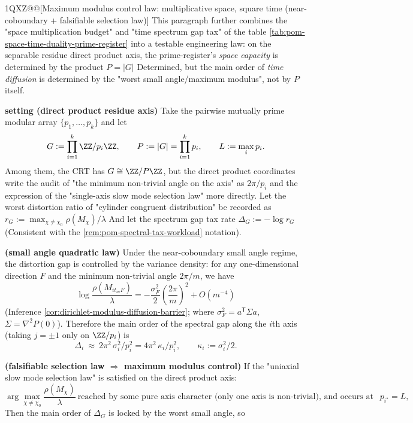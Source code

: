 \begin@@ZXQPH1QXZ@@[Maximum modulus control law: multiplicative space, square time (near-coboundary + falsifiable selection law)]\label{rem:pom-max-modulus-control-law}
This paragraph further combines the "space multiplication budget" and "time spectrum gap tax" of the table \ref{tab:pom-space-time-duality-prime-register} into a testable engineering law: on the separable residue direct product axis, the prime-register's \emph{space capacity} is determined by the product \(P=|G|\) Determined, but the main order of \emph{time diffusion} is determined by the "worst small angle/maximum modulus", not by \(P\) itself.
\par
\medskip\noindent\textbf{setting (direct product residue axis)}
Take the pairwise mutually prime modular array \(\{p_1,\dots,p_k\}\) and let
\[
G:=\prod_{i=1}^k\ZZ/p_i\ZZ,
\qquad
P:=|G|=\prod_{i=1}^k p_i,
\qquad
L:=\max_i p_i.
\]
Among them, the CRT has \(G\cong \ZZ/P\ZZ\), but the direct product coordinates write the audit of "the minimum non-trivial angle on the axis" as \(2\pi/p_i\) and the expression of the "single-axis slow mode selection law" more directly.
Let the worst distortion ratio of "cylinder congruent distribution" be recorded as
\(
r_G:=\max_{\chi\neq\chi_0}\rho(M_\chi)/\lambda
\)
And let the spectrum gap tax rate
\(
\Delta_G:=-\log r_G
\)
(Consistent with the \ref{rem:pom-spectral-tax-workload} notation).
\par
\medskip\noindent\textbf{(small angle quadratic law)}
Under the near-coboundary small angle regime, the distortion gap is controlled by the variance density: for any one-dimensional direction \(F\) and the minimum non-trivial angle \(2\pi/m\), we have
\[
\log\frac{\rho(M_{it_mF})}{\lambda}
=-\frac{\sigma_F^2}{2}\left(\frac{2\pi}{m}\right)^2+O(m^{-4})
\]
(Inference \ref{cor:dirichlet-modulus-diffusion-barrier}; where \(\sigma_F^2=a^{\mathsf T}\Sigma a\), \(\Sigma=\nabla^2P(0)\)).
Therefore the main order of the spectral gap along the \(i\)th axis (taking \(j=\pm1\) only on \(\ZZ/p_i\)) is
\[
\Delta_i\ \approx\ 2\pi^2\,\sigma_i^2/p_i^2
=4\pi^2\,\kappa_i/p_i^2,
\qquad \kappa_i:=\sigma_i^2/2.
\]
\par
\medskip\noindent\textbf{(falsifiable selection law \(\Rightarrow\) maximum modulus control)}
If the "uniaxial slow mode selection law" is satisfied on the direct product axis:
\[
\arg\max_{\chi\neq\chi_0}\frac{\rho(M_\chi)}{\lambda}
\ \text{reached by some pure axis character (only one axis is non-trivial), and occurs at maximum modulus }p_{i^\star}=L,
\]
Then the main order of \(\Delta_G\) is locked by the worst small angle, so
